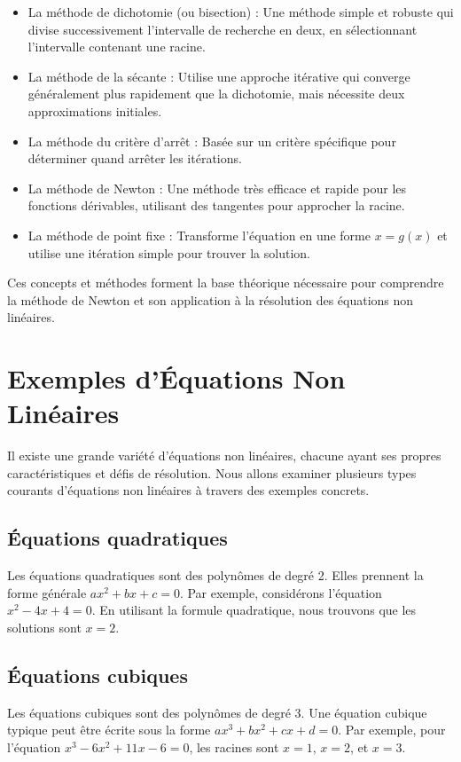 \documentclass{article}
\begin{document}
\begin{itemize}
    \item La méthode de dichotomie (ou bisection) : Une méthode simple et robuste qui divise successivement l'intervalle de recherche en deux, en sélectionnant l'intervalle contenant une racine.
    \item La méthode de la sécante : Utilise une approche itérative qui converge généralement plus rapidement que la dichotomie, mais nécessite deux approximations initiales.
    \item La méthode du critère d'arrêt : Basée sur un critère spécifique pour déterminer quand arrêter les itérations.
    \item La méthode de Newton : Une méthode très efficace et rapide pour les fonctions dérivables, utilisant des tangentes pour approcher la racine.
    \item La méthode de point fixe : Transforme l'équation en une forme $x = g(x)$ et utilise une itération simple pour trouver la solution.
\end{itemize}

Ces concepts et méthodes forment la base théorique nécessaire pour comprendre la méthode de Newton et son application à la résolution des équations non linéaires.

\section{Exemples d'Équations Non Linéaires}
Il existe une grande variété d'équations non linéaires, chacune ayant ses propres caractéristiques et défis de résolution. Nous allons examiner plusieurs types courants d'équations non linéaires à travers des exemples concrets.

\subsection{Équations quadratiques}
Les équations quadratiques sont des polynômes de degré 2. Elles prennent la forme générale $ax^2 + bx + c = 0$. Par exemple, considérons l'équation $x^2 - 4x + 4 = 0$. En utilisant la formule quadratique, nous trouvons que les solutions sont $x = 2$.

\subsection{Équations cubiques}
Les équations cubiques sont des polynômes de degré 3. Une équation cubique typique peut être écrite sous la forme $ax^3 + bx^2 + cx + d = 0$. Par exemple, pour l'équation $x^3 - 6x^2 + 11x - 6 = 0$, les racines sont $x = 1$, $x = 2$, et $x = 3$.
\end{document}
